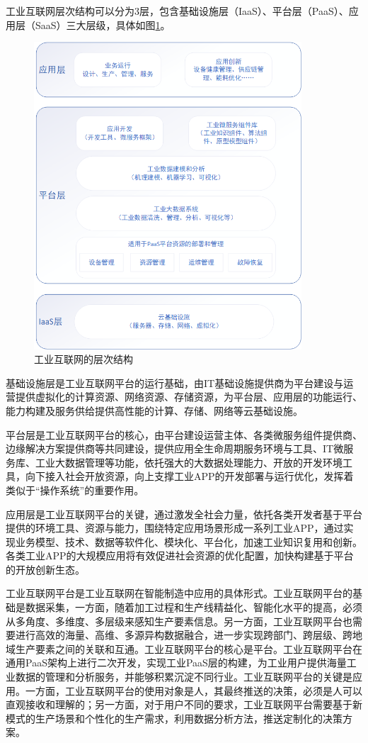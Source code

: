 \documentclass[lang=cn,12pt,bibtex,newtx,twoside,margintrue,citestyle=gb7714-2015, bibstyle=gb7714-2015]{elegantbook}
\begin{document}
工业互联网层次结构可以分为3层，包含基础设施层（IaaS）、平台层（PaaS）、应用层（SaaS）三大层级，具体如图\ref{2.11}。

\begin{figure}[htbp]
\centering
\includegraphics[angle=0,width=10cm]{./figure/2.11.png}
\caption{\label{2.11}工业互联网的层次结构}
\end{figure}

基础设施层是工业互联网平台的运行基础，由IT基础设施提供商为平台建设与运营提供虚拟化的计算资源、网络资源、存储资源，为平台层、应用层的功能运行、能力构建及服务供给提供高性能的计算、存储、网络等云基础设施。

平台层是工业互联网平台的核心，由平台建设运营主体、各类微服务组件提供商、边缘解决方案提供商等共同建设，提供应用全生命周期服务环境与工具、IT微服务库、工业大数据管理等功能，依托强大的大数据处理能力、开放的开发环境工具，向下接入社会开放资源，向上支撑工业APP的开发部署与运行优化，发挥着类似于“操作系统”的重要作用。

应用层是工业互联网平台的关键，通过激发全社会力量，依托各类开发者基于平台提供的环境工具、资源与能力，围绕特定应用场景形成一系列工业APP，通过实现业务模型、技术、数据等软件化、模块化、平台化，加速工业知识复用和创新。各类工业APP的大规模应用将有效促进社会资源的优化配置，加快构建基于平台的开放创新生态。


工业互联网平台是工业互联网在智能制造中应用的具体形式\cite{李亚敏2023}。工业互联网平台的基础是数据采集，一方面，随着加工过程和生产线精益化、智能化水平的提高，必须从多角度、多维度、多层级来感知生产要素信息。另一方面，工业互联网平台也需要进行高效的海量、高维、多源异构数据融合，进一步实现跨部门、跨层级、跨地域生产要素之间的关联和互通。工业互联网平台的核心是平台。工业互联网平台在通用PaaS架构上进行二次开发，实现工业PaaS层的构建，为工业用户提供海量工业数据的管理和分析服务，并能够积累沉淀不同行业。工业互联网平台的关键是应用。一方面，工业互联网平台的使用对象是人，其最终推送的决策，必须是人可以直观接收和理解的；另一方面，对于用户不同的要求，工业互联网平台需要基于新模式的生产场景和个性化的生产需求，利用数据分析方法，推送定制化的决策方案。
\end{document}
